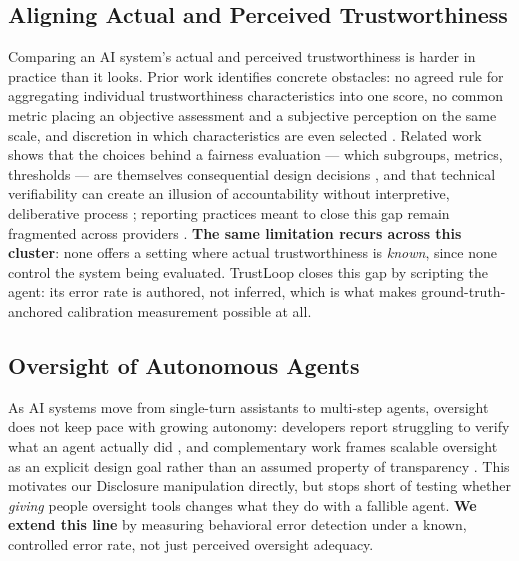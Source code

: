 \documentclass[manuscript]{acmart}
\begin{document}
\subsection{Aligning Actual and Perceived Trustworthiness}
Comparing an AI system's actual and perceived trustworthiness is harder in practice than it looks. Prior work identifies concrete obstacles: no agreed rule for aggregating individual trustworthiness characteristics into one score, no common metric placing an objective assessment and a subjective perception on the same scale, and discretion in which characteristics are even selected \cite{delibtrust2026}. Related work shows that the choices behind a fairness evaluation --- which subgroups, metrics, thresholds --- are themselves consequential design decisions \cite{barocas2021disaggregated}, and that technical verifiability can create an illusion of accountability without interpretive, deliberative process \cite{paris2026donttrust}; reporting practices meant to close this gap remain fragmented across providers \cite{balayn2026reporting}. \textbf{The same limitation recurs across this cluster}: none offers a setting where actual trustworthiness is \emph{known}, since none control the system being evaluated. TrustLoop closes this gap by scripting the agent: its error rate is authored, not inferred, which is what makes ground-truth-anchored calibration measurement possible at all.

\subsection{Oversight of Autonomous Agents}
As AI systems move from single-turn assistants to multi-step agents, oversight does not keep pace with growing autonomy: developers report struggling to verify what an agent actually did \cite{dhanorkar2026oversight}, and complementary work frames scalable oversight as an explicit design goal rather than an assumed property of transparency \cite{jain2026complementarity}. This motivates our Disclosure manipulation directly, but stops short of testing whether \emph{giving} people oversight tools changes what they do with a fallible agent. \textbf{We extend this line} by measuring behavioral error detection under a known, controlled error rate, not just perceived oversight adequacy.
\end{document}
